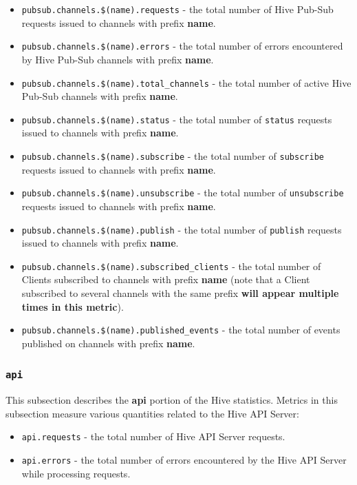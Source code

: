 \documentclass[a4paper]{article}
\begin{document}
\begin{itemize}
\item \texttt{pubsub.channels.\$(name).requests} - the total number of Hive Pub-Sub requests issued to channels with prefix \textbf{name}.
\item \texttt{pubsub.channels.\$(name).errors} - the total number of errors encountered by Hive Pub-Sub channels with prefix \textbf{name}.
\item \texttt{pubsub.channels.\$(name).total\_channels} - the total number of active Hive Pub-Sub channels with prefix \textbf{name}.
\item \texttt{pubsub.channels.\$(name).status} - the total number of \texttt{status} requests issued to channels with prefix \textbf{name}.
\item \texttt{pubsub.channels.\$(name).subscribe} - the total number of \texttt{subscribe} requests issued to channels with prefix \textbf{name}.
\item \texttt{pubsub.channels.\$(name).unsubscribe} - the total number of \texttt{unsubscribe} requests issued to channels with prefix \textbf{name}.
\item \texttt{pubsub.channels.\$(name).publish} - the total number of \texttt{publish} requests issued to channels with prefix \textbf{name}.
\item \texttt{pubsub.channels.\$(name).subscribed\_clients} - the total number of Clients subscribed to channels with prefix \textbf{name} (note that a Client subscribed to several channels with the same prefix \textbf{will appear multiple times in this metric}).
\item \texttt{pubsub.channels.\$(name).published\_events} - the total number of events published on channels with prefix \textbf{name}.
\end{itemize}
\subsubsection{\texttt{api}}
\label{sec-4-2-16}

This subsection describes the \textbf{api} portion of the Hive statistics. Metrics in this subsection measure various quantities related to the Hive API Server:


\begin{itemize}
\item \texttt{api.requests} - the total number of Hive API Server requests.
\item \texttt{api.errors} - the total number of errors encountered by the Hive API Server while processing requests.
\end{itemize}
\end{document}
